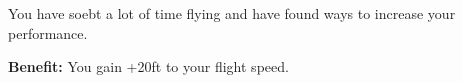 
You have soebt a lot of time flying and have found ways to increase your performance.

\textbf{Benefit:} You gain +20ft to your flight speed.